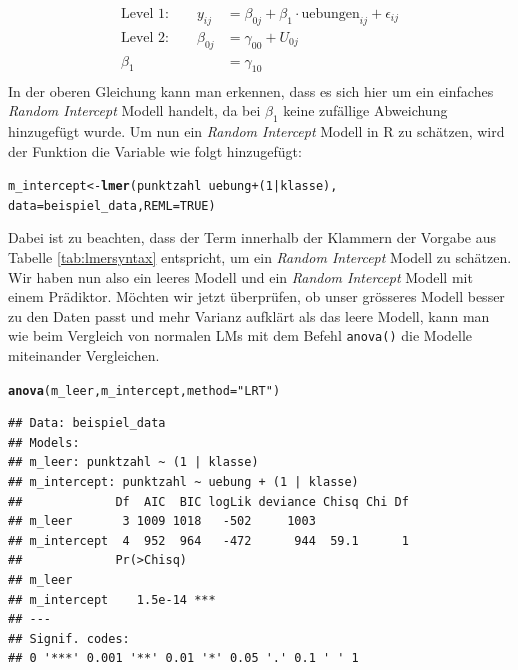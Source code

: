 \documentclass[12pt]{article}\usepackage[]{graphicx}\usepackage[]{color}
\makeatletter
\newcommand{\hlnum}[1]{\textcolor[rgb]{0.686,0.059,0.569}{#1}}%
\newcommand{\hlstr}[1]{\textcolor[rgb]{0.192,0.494,0.8}{#1}}%
\newcommand{\hlopt}[1]{\textcolor[rgb]{0,0,0}{#1}}%
\newcommand{\hlstd}[1]{\textcolor[rgb]{0.345,0.345,0.345}{#1}}%
\newcommand{\hlkwb}[1]{\textcolor[rgb]{0.69,0.353,0.396}{#1}}%
\newcommand{\hlkwc}[1]{\textcolor[rgb]{0.333,0.667,0.333}{#1}}%
\newcommand{\hlkwd}[1]{\textcolor[rgb]{0.737,0.353,0.396}{\textbf{#1}}}%
\newenvironment{kframe}{%
 \def\at@end@of@kframe{}%
 \ifinner\ifhmode%
  \def\at@end@of@kframe{\end{minipage}}%
  \begin{minipage}{\columnwidth}%
 \fi\fi%
 \def\FrameCommand##1{\hskip\@totalleftmargin \hskip-\fboxsep
 \colorbox{shadecolor}{##1}\hskip-\fboxsep
     \hskip-\linewidth \hskip-\@totalleftmargin \hskip\columnwidth}%
 \MakeFramed {\advance\hsize-\width
   \@totalleftmargin\z@ \linewidth\hsize
   \@setminipage}}%
 {\par\unskip\endMakeFramed%
 \at@end@of@kframe}
\newenvironment{knitrout}{}{} %
\makeatother
\begin{document}
\begin{equation}
\begin{split}	
 \text{Level 1:}  \qquad y_{ij} & = \beta_{0j} + \beta_{1} \cdot \text{uebungen}_{ij} + \epsilon_{ij}\\
 \text{Level 2:} \qquad \beta_{0j} & = \gamma_{00} + U_{0j}\\
 \beta_{1} & = \gamma_{10}\\
\end{split}	
\end{equation} 
In der oberen Gleichung kann man erkennen, dass es sich hier um ein einfaches \textit{Random Intercept} Modell handelt, da bei $\beta_{1}$ keine zufällige Abweichung hinzugefügt wurde. Um nun ein \textit{Random Intercept} Modell in R zu schätzen, wird der Funktion die Variable wie folgt hinzugefügt:

\singlespacing
\begin{knitrout}
\color{fgcolor}\begin{kframe}
\begin{alltt}
\hlstd{m_intercept} \hlkwb{<-} \hlkwd{lmer}\hlstd{(punktzahl} \hlopt{~} \hlstd{uebung} \hlopt{+} \hlstd{(}\hlnum{1} \hlopt{|} \hlstd{klasse),}
        \hlkwc{data} \hlstd{= beispiel_data,} \hlkwc{REML} \hlstd{=} \hlnum{TRUE}\hlstd{)}
\end{alltt}
\end{kframe}
\end{knitrout}

Dabei ist zu beachten, dass der Term innerhalb der Klammern der Vorgabe aus Tabelle \ref{tab:lmersyntax} entspricht, um ein \textit{Random Intercept} Modell zu schätzen. Wir haben nun also ein leeres Modell und ein \textit{Random Intercept} Modell mit einem Prädiktor. Möchten wir jetzt überprüfen, ob unser grösseres Modell besser zu den Daten passt und mehr Varianz aufklärt als das leere Modell, kann man wie beim Vergleich von normalen LMs mit dem Befehl \texttt{anova()} die Modelle miteinander Vergleichen. 

\singlespacing
\begin{knitrout}
\color{fgcolor}\begin{kframe}
\begin{alltt}
\hlkwd{anova}\hlstd{(m_leer, m_intercept,} \hlkwc{method} \hlstd{=} \hlstr{"LRT"}\hlstd{)}
\end{alltt}


{\ttfamily\noindent\itshape\color{messagecolor}{\#\# refitting model(s) with ML (instead of REML)}}\begin{verbatim}
## Data: beispiel_data
## Models:
## m_leer: punktzahl ~ (1 | klasse)
## m_intercept: punktzahl ~ uebung + (1 | klasse)
##             Df  AIC  BIC logLik deviance Chisq Chi Df
## m_leer       3 1009 1018   -502     1003             
## m_intercept  4  952  964   -472      944  59.1      1
##             Pr(>Chisq)    
## m_leer                    
## m_intercept    1.5e-14 ***
## ---
## Signif. codes:  
## 0 '***' 0.001 '**' 0.01 '*' 0.05 '.' 0.1 ' ' 1
\end{verbatim}
\end{kframe}
\end{knitrout}
\end{document}
